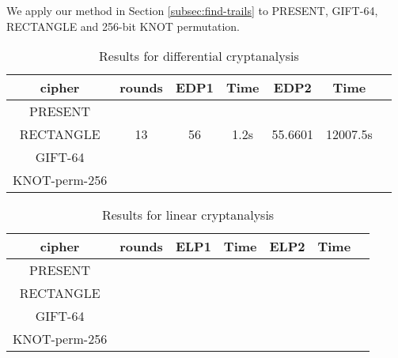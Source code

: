 We apply our method in Section \ref{subsec:find-trails} to PRESENT, GIFT-64, RECTANGLE and 256-bit KNOT permutation. 

\begin{table}
	\caption{Results for differential cryptanalysis}\label{tab:EDP}
	\centering
	\begin{tabular}{|c|c|c|c|c|c|c|}
		\hline
		cipher & rounds & EDP1 & Time & EDP2 & Time \\
		\hline
		PRESENT & \\
		\hline 
		RECTANGLE & 13 & 56 & 1.2s & 55.6601 & 12007.5s \\
		\hline
		GIFT-64 \\
		\hline
		KNOT-perm-256 \\
		\hline
	\end{tabular}
\end{table}

\begin{table}
	\caption{Results for linear cryptanalysis}\label{tab:ELP}
	\centering
	\begin{tabular}{|c|c|c|c|c|c|c|}
		\hline
		cipher & rounds & ELP1 & Time & ELP2 & Time \\
		\hline
		PRESENT & \\
		\hline 
		RECTANGLE \\
		\hline
		GIFT-64 \\
		\hline
		KNOT-perm-256 \\
		\hline
	\end{tabular}
\end{table}